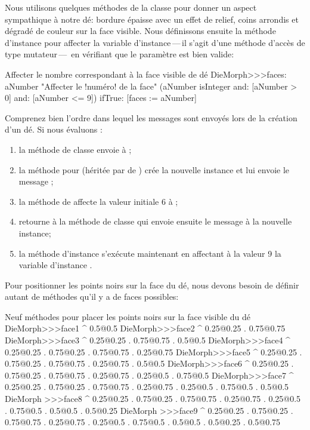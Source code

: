 \documentclass[a4paper,10pt,twoside]{book}
\begin{document}
Nous utilisons quelques méthodes de la classe 
pour donner un aspect sympathique à notre dé: bordure épaisse
avec un effet de relief, coins arrondis et dégradé de couleur sur
la face visible.
Nous définissons ensuite la méthode d'instance  pour
affecter la variable d'instance\,---\,il s'agit d'une méthode
d'accès de type mutateur\,---\, en vérifiant que le paramètre est
bien valide:
\begin{method}{Affecter le nombre correspondant à la face visible de dé}
DieMorph>>>faces: aNumber
	"Affecter le !numéro! de la face"
	(aNumber isInteger
			and: [aNumber > 0]
			and: [aNumber <= 9])
		ifTrue: [faces := aNumber]
\end{method}

Comprenez bien l'ordre dans lequel les messages sont envoyés lors de
la création d'un dé. Si nous évaluons :
\begin{enumerate}
	\item la méthode de classe  envoie
       à ;
	\item la méthode pour  (héritée par  de ) crée la nouvelle instance et lui envoie
       le message ;
	\item la méthode  de  affecte la
      valeur initiale 6 à ;
	\item {} retourne à la méthode de
      classe  qui envoie ensuite le
      message  à la nouvelle instance;
	\item la méthode d'instance  s'exécute
      maintenant en affectant à la valeur 9 la variable d'instance
      .
\end{enumerate}

Pour positionner les points noirs sur la face du dé, nous devons
besoin de définir autant de méthodes qu'il y a de faces possibles:

\begin{methods}{Neuf méthodes pour placer les points noirs sur la face visible du dé}
DieMorph>>>face1
	^ {0.5@0.5}
DieMorph>>>face2
	^ {0.25@0.25 . 0.75@0.75}
DieMorph>>>face3
	^ {0.25@0.25 . 0.75@0.75 . 0.5@0.5}
DieMorph>>>face4
	^ {0.25@0.25 . 0.75@0.25 . 0.75@0.75 . 0.25@0.75}
DieMorph>>>face5
	^ {0.25@0.25 . 0.75@0.25 . 0.75@0.75 . 0.25@0.75 . 0.5@0.5}
DieMorph>>>face6
	^ {0.25@0.25 . 0.75@0.25 . 0.75@0.75 . 0.25@0.75 . 0.25@0.5 . 0.75@0.5}
DieMorph>>>face7
	^ {0.25@0.25 . 0.75@0.25 . 0.75@0.75 . 0.25@0.75 . 0.25@0.5 . 0.75@0.5 . 0.5@0.5}
DieMorph >>>face8
	^ {0.25@0.25 . 0.75@0.25 . 0.75@0.75 . 0.25@0.75 . 0.25@0.5 . 0.75@0.5 . 0.5@0.5 . 0.5@0.25}
DieMorph >>>face9
	^ {0.25@0.25 . 0.75@0.25 . 0.75@0.75 . 0.25@0.75 . 0.25@0.5 . 0.75@0.5 . 0.5@0.5 . 0.5@0.25 . 0.5@0.75}
\end{methods}
\end{document}
